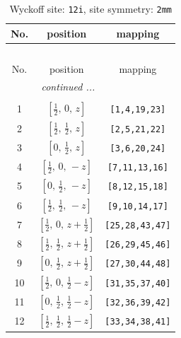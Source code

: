 \documentclass[fleqn,8pt]{jsarticle}
\begin{document}
\begin{longtable}{ccc}
\caption{Wyckoff site: {\tt 12i}, site symmetry: {\tt 2mm}}
 \\
 \hline \hline
No. & position & mapping \\ \hline \endfirsthead

\multicolumn{2}{l}{\tablename\ \thetable{}} \\
 \hline \hline
No. & position & mapping \\ \hline \endhead

 \hline \hline
\multicolumn{2}{r}{\footnotesize\it continued ...} \\ \endfoot

 \hline \hline
\multicolumn{2}{r}{} \\ \endlastfoot

1 & $\left[ \frac{1}{2},\, 0,\, z \right]$ & {\tt [1,4,19,23]} \\ \hline
2 & $\left[ \frac{1}{2},\, \frac{1}{2},\, z \right]$ & {\tt [2,5,21,22]} \\ \hline
3 & $\left[ 0,\, \frac{1}{2},\, z \right]$ & {\tt [3,6,20,24]} \\ \hline
4 & $\left[ \frac{1}{2},\, 0,\, - z \right]$ & {\tt [7,11,13,16]} \\ \hline
5 & $\left[ 0,\, \frac{1}{2},\, - z \right]$ & {\tt [8,12,15,18]} \\ \hline
6 & $\left[ \frac{1}{2},\, \frac{1}{2},\, - z \right]$ & {\tt [9,10,14,17]} \\ \hline
7 & $\left[ \frac{1}{2},\, 0,\, z + \frac{1}{2} \right]$ & {\tt [25,28,43,47]} \\ \hline
8 & $\left[ \frac{1}{2},\, \frac{1}{2},\, z + \frac{1}{2} \right]$ & {\tt [26,29,45,46]} \\ \hline
9 & $\left[ 0,\, \frac{1}{2},\, z + \frac{1}{2} \right]$ & {\tt [27,30,44,48]} \\ \hline
10 & $\left[ \frac{1}{2},\, 0,\, \frac{1}{2} - z \right]$ & {\tt [31,35,37,40]} \\ \hline
11 & $\left[ 0,\, \frac{1}{2},\, \frac{1}{2} - z \right]$ & {\tt [32,36,39,42]} \\ \hline
12 & $\left[ \frac{1}{2},\, \frac{1}{2},\, \frac{1}{2} - z \right]$ & {\tt [33,34,38,41]} \\
\end{longtable}
\renewcommand{\arraystretch}{1.2}
\end{document}
